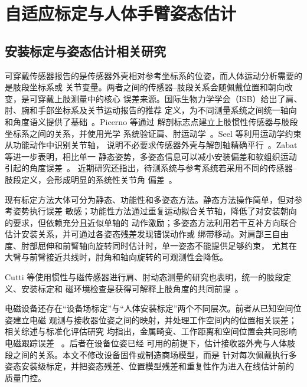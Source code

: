 
\chapter{自适应标定与人体手臂姿态估计}
\label{chap:adaptive_calibration_arm_estimation}

\section{安装标定与姿态估计相关研究}
\label{sec:ch4_related_calibration}

可穿戴传感器报告的是传感器外壳相对参考坐标系的位姿，而人体运动分析需要的是肢段坐标系或
关节变量。两者之间的传感器--肢段关系会随佩戴位置和朝向改变，是可穿戴上肢测量中的核心
误差来源。国际生物力学学会（ISB）给出了肩、肘、腕和手部坐标系及关节运动报告的推荐
定义，为不同测量系统之间统一轴向和角度语义提供了基础~\cite{wu2005isb}。Picerno 等通过
解剖标志点建立上肢惯性传感器与肢段坐标系之间的关系，并使用光学
系统验证肩、肘运动学~\cite{picerno2019upper}。Seel 等利用运动学约束从功能动作中识别关节轴，
说明不必要求传感器外壳与解剖轴精确平行~\cite{seel2014imu}。Zabat 等进一步表明，相比单一
静态姿势，多姿态信息可以减小安装偏差和软组织运动引起的角度误差~\cite{zabat2019multiple}。
近期研究还指出，待测系统与参考系统若采用不同的传感器--肢段定义，会形成明显的系统性关节角
偏差~\cite{adjel2025influence}。

现有标定方法大体可分为静态、功能性和多姿态方法。静态方法操作简单，但对参考姿势执行误差
敏感；功能性方法通过重复运动拟合关节轴，降低了对安装朝向的要求，但依赖充分且近似单轴的
动作激励；多姿态方法利用若干互补方向联合估计安装关系，并可通过各姿态残差发现错误动作或
绑带移动。对肩部三自由度、肘部屈伸和前臂轴向旋转同时估计时，单一姿态不能提供足够约束，
尤其在大臂与前臂接近共线时，肘角和轴向旋转的可观测性会降低。

Cutti 等使用惯性与磁传感器进行肩、肘动态测量的研究也表明，统一的肢段定义、安装标定和
磁环境检查是获得可解释上肢角度的共同前提~\cite{cutti2008ambulatory}。

电磁设备还存在“设备场标定”与“人体安装标定”两个不同层次。前者从已知空间位姿建立电磁
观测与接收器位姿之间的映射，并处理工作空间内的位置相关误差；相关综述与标准化评估研究
均指出，金属畸变、工作距离和空间位置会共同影响电磁跟踪误差
~\cite{kindratenko2000survey,frantz2003accuracy,hummel2006evaluation,franz2014electromagnetic,
maclachlan2025calibration}。后者在设备位姿已经
可用的前提下，估计接收器外壳与人体肢段之间的关系。本文不修改设备固件或制造商场模型，而是
针对每次佩戴执行多姿态安装级标定，并把姿态残差、位置模型残差和重复性作为进入在线估计前的
质量门控。


